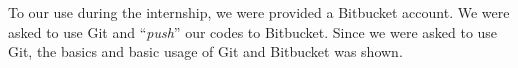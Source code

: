 To our use during the internship, we were provided a Bitbucket account. We were asked to use Git and ``\textit{push}'' our codes to Bitbucket. Since we were asked to use Git, the basics and basic usage of Git and Bitbucket was shown. 








